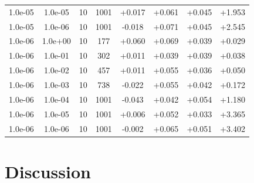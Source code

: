 \documentclass[11pt,a4paper]{article}
\begin{document}
\begin{table}
{\begin{tabular}{*{8}c}
\rowcolor{red} 1.0e-05 	 & 1.0e-05 	 & 10 & 1001 	 & +0.017 & +0.061 & +0.045 & +1.953 \\ 
\rowcolor{red}  1.0e-05 	 & 1.0e-06 	 & 10 & 1001 	 & -0.018 & +0.071 & +0.045 & +2.545 \\ 
 1.0e-06 	 & 1.0e+00 	 & 10 & 177 	 & +0.060 & +0.069 & +0.039 & +0.029 \\ 
 1.0e-06 	 & 1.0e-01 	 & 10 & 302 	 & +0.011 & +0.039 & +0.039 & +0.038 \\ 
 1.0e-06 	 & 1.0e-02 	 & 10 & 457 	 & +0.011 & +0.055 & +0.036 & +0.050 \\ 
 1.0e-06 	 & 1.0e-03 	 & 10 & 738 	 & -0.022 & +0.055 & +0.042 & +0.172 \\ 
\rowcolor{red}  1.0e-06 	 & 1.0e-04 	 & 10 & 1001 	 & -0.043 & +0.042 & +0.054 & +1.180 \\ 
\rowcolor{red}  1.0e-06 	 & 1.0e-05 	 & 10 & 1001 	 & +0.006 & +0.052 & +0.033 & +3.365 \\ 
\rowcolor{red}  1.0e-06 	 & 1.0e-06 	 & 10 & 1001 	 & -0.002 & +0.065 & +0.051 & +3.402 \\ 
\end{tabular}}
\label{Tab::1}
\end{table} 
%
%
%
%
\section{Discussion}
\end{document}

